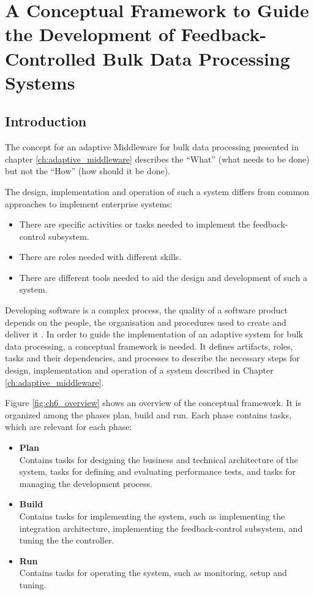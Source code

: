 

\chapter[Conceptual Framework]{A Conceptual Framework to Guide the Development of Feedback-Controlled Bulk Data Processing Systems}\label{ch:conceptual_framework}

\section{Introduction} 

The concept for an adaptive Middleware for bulk data processing presented in chapter \ref{ch:adaptive_middleware} describes the ``What'' (what needs to be done) but not the ``How'' (how should it be done).

The design, implementation and operation of such a system differs from common approaches to implement enterprise systems:
\begin{itemize}
	\item There are specific activities or tasks needed to implement the feedback-control subsystem.
	\item There are roles needed with different skills.
	\item There are different tools needed to aid the design and development of such a system.
\end{itemize}

Developing software is a complex process, the quality of a software product depends on the people, the organisation and procedures used to create and deliver it \citep{Fuggetta:2000ds}.
In order to guide the implementation of an adaptive system for bulk data processing, a conceptual framework is needed. It defines artifacts, roles, tasks and their dependencies, and processes to describe the necessary steps for design, implementation and operation of a system described in Chapter \ref{ch:adaptive_middleware}.

Figure \ref{fig:ch6_overview} shows an overview of the conceptual framework. It is organized among the phases plan, build and run. Each phase contains tasks, which are relevant for each phase:
\begin{itemize}
	\item \textbf{Plan}\\
	Contains tasks for designing the business and technical architecture of the system, tasks for defining and evaluating performance tests, and tasks for managing the development process.
	\item \textbf{Build}\\
	Contains tasks for implementing the system, such as implementing the integration architecture, implementing the feedback-control subsystem, and tuning the the controller. 
	\item \textbf{Run}\\
	Contains tasks for operating the system, such as monitoring, setup and tuning.
\end{itemize}

